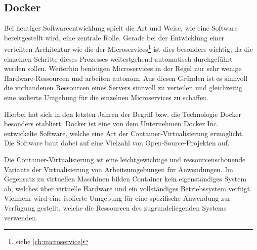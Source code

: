 \subsection{Docker}
\label{ssec:Docker}
Bei heutiger Softwareentwicklung spielt die Art und Weise, wie eine Software bereitgestellt wird, eine zentrale Rolle. 
Gerade bei der Entwicklung einer verteilten Architektur wie die der Microservices\footnote{siehe \ref{ch:microservice}} ist dies besonders wichtig, da die einzelnen Schritte dieses Prozesses weitestgehend automatisch durchgeführt werden sollen. 
Weiterhin benötigen Microservices in der Regel nur sehr wenige Hardware-Ressourcen und arbeiten autonom. 
Aus diesen Gründen ist es sinnvoll die vorhandenen Ressourcen eines Servers sinnvoll zu verteilen und gleichzeitig eine isolierte Umgebung für die einzelnen Microservices zu schaffen.

Hierbei hat sich in den letzten Jahren der Begriff bzw. die Technologie Docker besonders etabliert.
Docker ist eine von dem Unternehmen Docker Inc. entwickelte Software, welche eine Art der Container-Virtualisierung ermöglicht. 
Die Software baut dabei auf eine Vielzahl von Open-Source-Projekten auf.

Die Container-Virtualisierung ist eine leichtgewichtige und ressourcenschonende Variante der Virtualisierung von Arbeitsumgebungen für Anwendungen. 
Im Gegensatz zu virtuellen Maschinen bilden Container kein eigenständiges System ab, welches über virtuelle Hardware und ein vollständiges Betriebssystem verfügt. 
Vielmehr wird eine isolierte Umgebung für eine spezifische Anwendung zur Verfügung gestellt, welche die Ressourcen des zugrundeliegenden Systems verwenden. 


